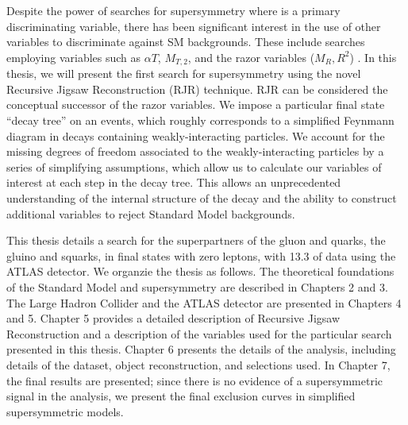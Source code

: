 Despite the power of searches for supersymmetry where \met is a primary discriminating variable, there has been significant interest in the use of other variables to discriminate against SM backgrounds.
These include searches employing variables such as $\alpha{T}$, $ M_{T,2}$, and the razor variables ($M_R, R^2$) \cite{SUSY-2014-05, SUSY-2014-06, SUSY-2014-07, CMS-SUS-12-005, CMS-SUS-11-024, CMS-SUS-12-005, CMS-SUS-10-003, CMS-SUS-11-003, CMS-SUS-12-002,CMS-SUS-13-019, CMS-SUS-15-003, SUSY-2011-22}.
In this thesis, we will present the first search for supersymmetry using the novel Recursive Jigsaw Reconstruction (RJR) technique.
RJR can be considered the conceptual successor of the razor variables.
We impose a particular final state ``decay tree'' on an events, which roughly corresponds to a simplified Feynmann diagram in decays containing weakly-interacting particles.
We account for the missing degrees of freedom associated to the weakly-interacting particles by a series of simplifying assumptions, which allow us to calculate our variables of interest at each step in the decay tree.
This allows an unprecedented understanding of the internal structure of the decay and the ability to construct additional variables to reject Standard Model backgrounds.

This thesis details a search for the superpartners of the gluon and quarks, the gluino and squarks, in final states with zero leptons, with 13.3 \ifb of data using the ATLAS detector.
We organzie the thesis as follows.
The theoretical foundations of the Standard Model and supersymmetry are described in Chapters 2 and 3.
The Large Hadron Collider and the ATLAS detector are presented in Chapters 4 and 5.
Chapter 5 provides a detailed description of Recursive Jigsaw Reconstruction and a description of the variables used for the particular search presented in this thesis.
Chapter 6 presents the details of the analysis, including details of the dataset, object reconstruction, and selections used.
In Chapter 7, the final results are presented; since there is no evidence of a supersymmetric signal in the analysis, we present the final exclusion curves in simplified supersymmetric models.
